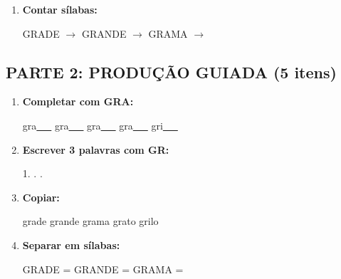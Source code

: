\begin{exercicio}
\begin{enumerate}
  \item \textbf{Contar sílabas:}
  \begin{center}
  GRADE $\rightarrow$ \underline{\hspace{0.9cm}} \quad GRANDE $\rightarrow$ \underline{\hspace{0.9cm}} \quad GRAMA $\rightarrow$ \underline{\hspace{0.9cm}}
  \end{center}

\end{enumerate}

\subsection*{PARTE 2: PRODUÇÃO GUIADA (5 itens)}

\begin{enumerate}[resume]

  \item \textbf{Completar com GRA:}
  \begin{center}
  gra\underline{~~~} \quad gra\underline{~~~} \quad gra\underline{~~~} \quad gra\underline{~~~} \quad gri\underline{~~~}
  \end{center}

  \item \textbf{Escrever 3 palavras com GR:}
  \begin{center}
  1. \underline{\hspace{3cm}} . \underline{\hspace{3cm}} . \underline{\hspace{3cm}}
  \end{center}

  \item \textbf{Copiar:}
  \begin{center}
  grade \quad grande \quad grama \quad grato \quad grilo
  \end{center}

  \item \textbf{Separar em sílabas:}
  \begin{center}
  GRADE = \underline{\hspace{1cm}} \underline{\hspace{1cm}} \quad GRANDE = \underline{\hspace{1cm}} \underline{\hspace{1cm}} \quad GRAMA = \underline{\hspace{1cm}} \underline{\hspace{1cm}}
  \end{center}


\end{enumerate}
\end{exercicio}
